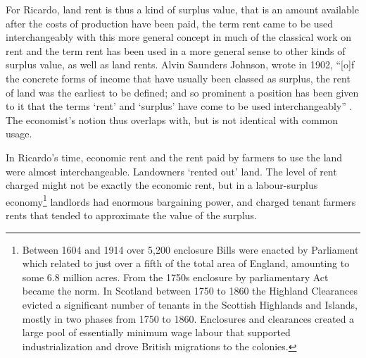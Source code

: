 For Ricardo, %
\gls{land rent} is thus a kind of \gls{surplus value}, that is an amount available after the costs of production have been paid, the term rent came to be used interchangeably with this more general concept in much of the classical work on rent and the term rent has been used in a more general sense to other kinds of surplus value, as well as land rents. %
Alvin Saunders Johnson, wrote in 1902, ``[o]f the concrete forms of income that have usually been classed as surplus, the rent of land was the earliest to be defined; and so prominent a position has been given to it that the terms `rent' and `surplus' have come to be used interchangeably'' \cite{johnsonRentModernEconomic1902}. 
The economist's notion thus overlaps with, but is not identical with common usage. 

In Ricardo's time, economic rent and the rent paid by farmers to use the land were almost interchangeable. Landowners `rented out' land. The level of rent charged might not be exactly the economic rent, but in a labour-surplus economy\footnote{Between 1604 and 1914 over 5,200 enclosure Bills were enacted by Parliament which related to just over a fifth of the total area of England, amounting to some 6.8 million acres. From the 1750s enclosure by parliamentary Act became the norm. In Scotland  between 1750 to 1860 the  Highland Clearances  evicted a significant number of tenants in the Scottish Highlands and Islands, mostly in two phases from 1750 to 1860. Enclosures and clearances created a large pool of essentially minimum wage labour that supported industrialization and drove British migrations to the colonies.} landlords had enormous bargaining power, and charged tenant farmers rents that tended to approximate the value of the \gls{surplus}. %
 

